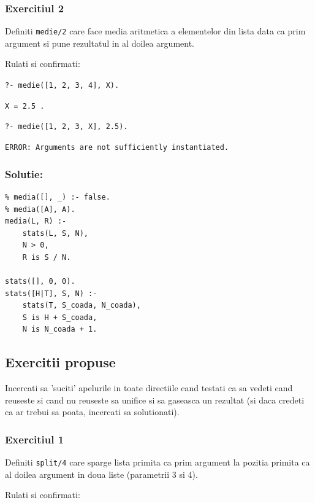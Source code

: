 \subsubsection*{Exercitiul 2}

Definiti \texttt{medie/2} care face media aritmetica a elementelor din lista data ca prim argument si pune rezultatul in al doilea argument.

Rulati si confirmati:

\texttt{?- medie([1, 2, 3, 4], X).}

\texttt{X = 2.5 .}

\texttt{?- medie([1, 2, 3, X], 2.5).}

\texttt{ERROR: Arguments are not sufficiently instantiated.}

\subsubsection*{Solutie:}

\begin{lstlisting}
% media([], _) :- false.
% media([A], A).
media(L, R) :-
    stats(L, S, N),
    N > 0,
    R is S / N.

stats([], 0, 0).
stats([H|T], S, N) :-
    stats(T, S_coada, N_coada),
    S is H + S_coada,
    N is N_coada + 1.
\end{lstlisting}






\subsection*{Exercitii propuse}

\begin{remark}
	Incercati sa 'suciti' apelurile in toate directiile cand testati ca sa vedeti cand reuseste si cand nu reuseste sa unifice si sa gaseasca un rezultat (si daca credeti ca ar trebui sa poata, incercati sa solutionati).
\end{remark}



\subsubsection*{Exercitiul 1}

Definiti \texttt{split/4} care sparge lista primita ca prim argument la pozitia primita ca al doilea argument in doua liste (parametrii 3 si 4).

Rulati si confirmati:


